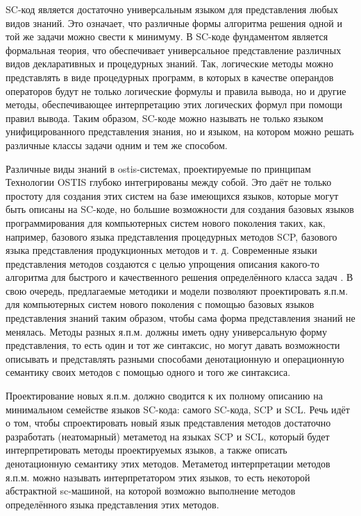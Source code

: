 \begin{textitemize}
    \item SC-код является достаточно универсальным языком для представления любых видов знаний. Это означает, что различные формы алгоритма решения одной и той же задачи можно свести к минимуму. В SC-коде фундаментом является формальная теория, что обеспечивает универсальное представление различных видов декларативных и процедурных знаний. Так, логические методы можно представлять в виде процедурных программ, в которых в качестве операндов операторов будут не только логические формулы и правила вывода, но и другие методы, обеспечивающее интерпретацию этих логических формул при помощи правил вывода. Таким образом, SC-коде можно называть не только языком унифицированного представления знания, но и языком, на котором можно решать различные классы задачи одним и тем же способом.
    \item Различные виды знаний в ostis-системах, проектируемые по принципам Технологии OSTIS глубоко интегрированы между собой. Это даёт не только простоту для создания этих систем на базе имеющихся языков, которые могут быть описаны на SC-коде, но большие возможности для создания базовых языков программирования для компьютерных систем нового поколения таких, как, например, базового языка представления процедурных методов SCP, базового языка представления продукционных методов и т. д. Современные языки представления методов создаются с целью упрощения описания какого-то алгоритма для быстрого и качественного решения определённого класса задач \cite{Benri2000}. В свою очередь, предлагаемые методики и модели позволяют проектировать я.п.м. для компьютерных систем нового поколения с помощью базовых языков представления знаний таким образом, чтобы сама форма представления знаний не менялась. Методы разных я.п.м. должны иметь одну универсальную форму представления, то есть один и тот же синтаксис, но могут давать возможности описывать и представлять разными способами денотационную и операционную семантику своих методов с помощью одного и того же синтаксиса.
    \item Проектирование новых я.п.м. должно сводится к их полному описанию на минимальном семействе языков SC-кода: самого SC-кода, SCP и SCL. Речь идёт о том, чтобы спроектировать новый язык представления методов достаточно разработать (неатомарный) метаметод на языках SCP и SCL, который будет интерпретировать методы проектируемых языков, а также описать денотационную семантику этих методов. Метаметод интерпретации методов я.п.м. можно называть интерпретатором этих языков, то есть некоторой абстрактной sc-машиной, на которой возможно выполнение методов определённого языка представления этих методов.
\end{textitemize}

